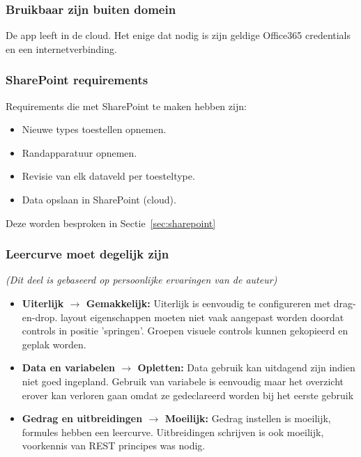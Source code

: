 
\subsubsection{Bruikbaar zijn buiten domein}

De app leeft in de cloud. Het enige dat nodig is zijn geldige Office365 credentials en een internetverbinding.

\subsubsection{SharePoint requirements}

Requirements die met SharePoint te maken hebben zijn:
\begin{itemize}
    \item Nieuwe types toestellen opnemen.
    \item Randapparatuur opnemen.
    \item Revisie van elk dataveld per toesteltype.
    \item Data opslaan in SharePoint (cloud).
\end{itemize}
Deze worden besproken in Sectie~\ref{sec:sharepoint}

\subsubsection{Leercurve moet degelijk zijn}
\textit{(Dit deel is gebaseerd op persoonlijke ervaringen van de auteur)}

\begin{itemize}
    \item \textbf{Uiterlijk $\rightarrow$ Gemakkelijk:} Uiterlijk is eenvoudig te configureren met drag-en-drop. layout eigenschappen moeten niet vaak aangepast worden doordat controls in positie 'springen'. Groepen visuele controls kunnen gekopieerd en geplak worden.
    \item \textbf{Data en variabelen $\rightarrow$ Opletten:} Data gebruik kan uitdagend zijn indien niet goed ingepland. Gebruik van variabele is eenvoudig maar het overzicht erover kan verloren gaan omdat ze gedeclareerd worden bij het eerste gebruik
    \item \textbf{Gedrag en uitbreidingen $\rightarrow$ Moeilijk:} Gedrag instellen is moeilijk, formules hebben een leercurve. Uitbreidingen schrijven is ook moeilijk, voorkennis van REST principes was nodig.
\end{itemize}

